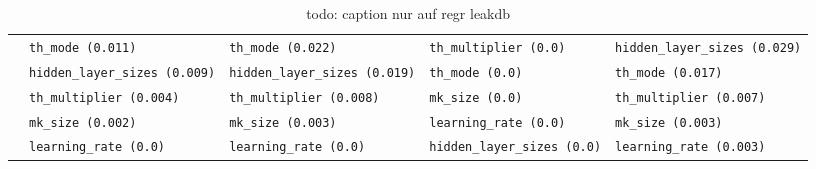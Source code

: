 \begin{table}[ht]
\begin{adjustwidth}{-3.5cm}{}
\begin{tabular}{lllll}
                  & \texttt{th\_mode (0.011)}             & \texttt{th\_mode (0.022)}             & \texttt{th\_multiplier (0.0)}       & \texttt{hidden\_layer\_sizes (0.029)} \\
                  & \texttt{hidden\_layer\_sizes (0.009)} & \texttt{hidden\_layer\_sizes (0.019)} & \texttt{th\_mode (0.0)}             & \texttt{th\_mode (0.017)}             \\
                  & \texttt{th\_multiplier (0.004)}       & \texttt{th\_multiplier (0.008)}       & \texttt{mk\_size (0.0)}             & \texttt{th\_multiplier (0.007)}       \\
                  & \texttt{mk\_size (0.002)}             & \texttt{mk\_size (0.003)}             & \texttt{learning\_rate (0.0)}       & \texttt{mk\_size (0.003)}             \\
                  & \texttt{learning\_rate (0.0)}         & \texttt{learning\_rate (0.0)}         & \texttt{hidden\_layer\_sizes (0.0)} & \texttt{learning\_rate (0.003)}      
        \end{tabular}
        \caption{todo: caption nur auf regr leakdb}
    \end{adjustwidth}
\end{table}

